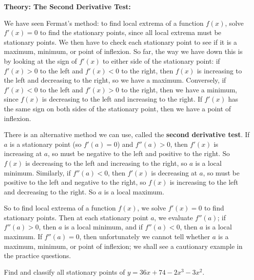 \documentclass{article}
\begin{document}
\clearpage




\textbf{Theory: The Second Derivative Test:}

\vspace{5mm}


We have seen Fermat's method: to find local extrema of a function $f(x)$, solve $f'(x)=0$ to find the stationary points, since all local extrema must be stationary points. We then have to check each stationary point to see if it is a maximum, minimum, or point of inflexion. So far, the way we have down this is by looking at the sign of $f'(x)$ to either side of the stationary point: if $f'(x)>0$ to the left and $f'(x)<0$ to the right, then $f(x)$ is increasing to the left and decreasing to the right, so we have a maximum. Conversely, if $f'(x)<0$ to the left and $f'(x)>0$ to the right, then we have a minimum, since $f(x)$ is decreasing to the left and increasing to the right. If $f'(x)$ has the same sign on both sides of the stationary point, then we have a point of inflexion.

There is an alternative method we can use, called the \textbf{second derivative test}. If $a$ is a stationary point (so $f'(a)=0$) and $f''(a)>0$, then $f'(x)$ is increasing at $a$, so must be negative to the left and positive to the right. So $f(x)$ is decreasing to the left and increasing to the right, so $a$ is a local minimum. Similarly, if $f''(a)<0$, then $f'(x)$ is decreasing at $a$, so must be positive to the left and negative to the right, so $f(x)$ is increasing to the left and decreasing to the right. So $a$ is a local maximum.

So to find local extrema of a function $f(x)$, we solve $f'(x)=0$ to find stationary points. Then at each stationary point $a$, we evaluate $f''(a)$; if $f''(a)>0$, then $a$ is a local minimum, and if $f''(a)<0$, then $a$ is a local maximum. If $f''(a)=0$, then unfortunately we cannot tell whether $a$ is a maximum, minimum, or point of inflexion; we shall see a cautionary example in the practice questions.\bigskip


Find and classify all stationary points of $y=36x+74-2x^3-3x^2$.

\vfill




\clearpage
\end{document}

